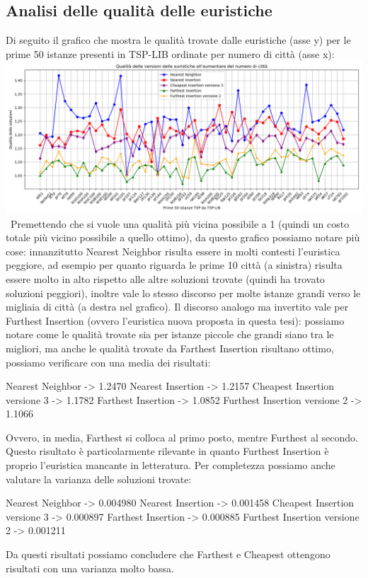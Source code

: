 \documentclass[a4paper,12pt]{report}
\begin{document}
\subsection{Analisi delle qualità delle euristiche}
Di seguito il grafico che mostra le qualità trovate dalle euristiche (asse y) per le prime 50 istanze presenti in TSP-LIB ordinate per numero di città (asse x): \newline
\includegraphics[width=1\textwidth]{../Grafici/7.png} \
Premettendo che si vuole una qualità più vicina possibile a 1 (quindi un costo totale più vicino possibile a quello ottimo), da questo grafico possiamo notare più cose: innanzitutto Nearest Neighbor risulta essere in molti contesti l'euristica peggiore, ad esempio per quanto riguarda le prime 10 città (a sinistra) risulta essere molto in alto rispetto alle altre soluzioni trovate (quindi ha trovato soluzioni peggiori), inoltre vale lo stesso discorso per molte istanze grandi verso le migliaia di città (a destra nel grafico). Il discorso analogo ma invertito vale per Furthest Insertion (ovvero l'euristica nuova proposta in questa tesi): possiamo notare come le qualità trovate sia per istanze piccole che grandi siano tra le migliori, ma anche le qualità trovate da Farthest Insertion risultano ottimo, possiamo verificare con una media dei risultati:
\begin{myverbatim}
Nearest Neighbor ->              1.2470
Nearest Insertion ->             1.2157
Cheapest Insertion versione 3 -> 1.1782
Farthest Insertion ->            1.0852
Furthest Insertion versione 2 -> 1.1066
\end{myverbatim}
Ovvero, in media, Farthest si colloca al primo posto, mentre Furthest al secondo. Questo risultato è particolarmente rilevante in quanto Furthest Insertion è proprio l'euristica mancante in letteratura. Per completezza possiamo anche valutare la varianza delle soluzioni trovate:
\begin{myverbatim}
Nearest Neighbor ->              0.004980
Nearest Insertion ->             0.001458
Cheapest Insertion versione 3 -> 0.000897
Farthest Insertion ->            0.000885
Furthest Insertion versione 2 -> 0.001211
\end{myverbatim}
Da questi risultati possiamo concludere che Farthest e Cheapest ottengono risultati con una varianza molto bassa.
\end{document}
